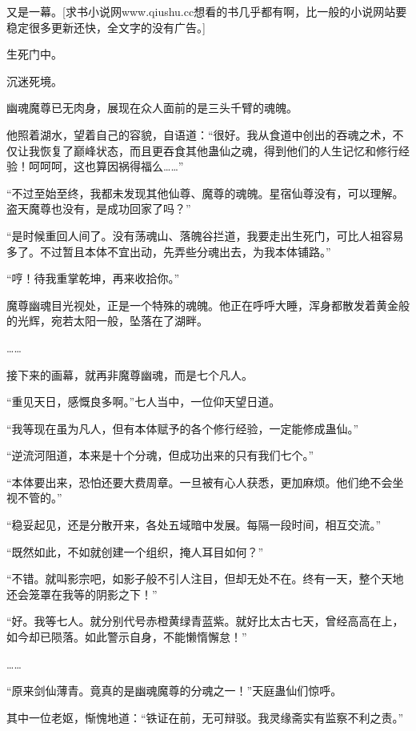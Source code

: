 
\begin{this_body}

又是一幕。[求书小说网www.qiushu.cc想看的书几乎都有啊，比一般的小说网站要稳定很多更新还快，全文字的没有广告。]

生死门中。

沉迷死境。

幽魂魔尊已无肉身，展现在众人面前的是三头千臂的魂魄。

他照着湖水，望着自己的容貌，自语道：“很好。我从食道中创出的吞魂之术，不仅让我恢复了巅峰状态，而且更吞食其他蛊仙之魂，得到他们的人生记忆和修行经验！呵呵呵，这也算因祸得福么……”

“不过至始至终，我都未发现其他仙尊、魔尊的魂魄。星宿仙尊没有，可以理解。盗天魔尊也没有，是成功回家了吗？”

“是时候重回人间了。没有荡魂山、落魄谷拦道，我要走出生死门，可比人祖容易多了。不过暂且本体不宜出动，先弄些分魂出去，为我本体铺路。”

“哼！待我重掌乾坤，再来收拾你。”

魔尊幽魂目光视处，正是一个特殊的魂魄。他正在呼呼大睡，浑身都散发着黄金般的光辉，宛若太阳一般，坠落在了湖畔。

……

接下来的画幕，就再非魔尊幽魂，而是七个凡人。

“重见天日，感慨良多啊。”七人当中，一位仰天望日道。

“我等现在虽为凡人，但有本体赋予的各个修行经验，一定能修成蛊仙。”

“逆流河阻道，本来是十个分魂，但成功出来的只有我们七个。”

“本体要出来，恐怕还要大费周章。一旦被有心人获悉，更加麻烦。他们绝不会坐视不管的。”

“稳妥起见，还是分散开来，各处五域暗中发展。每隔一段时间，相互交流。”

“既然如此，不如就创建一个组织，掩人耳目如何？”

“不错。就叫影宗吧，如影子般不引人注目，但却无处不在。终有一天，整个天地还会笼罩在我等的阴影之下！”

“好。我等七人。就分别代号赤橙黄绿青蓝紫。就好比太古七天，曾经高高在上，如今却已陨落。如此警示自身，不能懒惰懈怠！”

……

“原来剑仙薄青。竟真的是幽魂魔尊的分魂之一！”天庭蛊仙们惊呼。

其中一位老妪，惭愧地道：“铁证在前，无可辩驳。我灵缘斋实有监察不利之责。”


\end{this_body}
